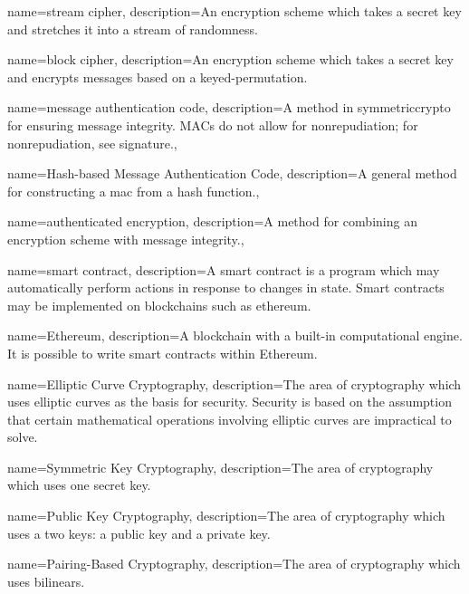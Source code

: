 {
    name={stream cipher},
    description={An \gls{encryption scheme} which takes a secret key
        and stretches it into a stream of randomness.}
}

{
    name={block cipher},
    description={An \gls{encryption scheme} which takes a secret key
        and encrypts messages based on a keyed-\gls{permutation}.}
}

{
    name={message authentication code},
    description={A method in \gls{symmetriccrypto} for ensuring
        message integrity.
        MACs do not allow for nonrepudiation;
        for nonrepudiation, see \gls{signature}.},
}

{
    name={Hash-based Message Authentication Code},
    description={A general method for constructing
        a \gls{mac} from a \gls{hash function}.},
}

{
    name={authenticated encryption},
    description={A method for combining an \gls{encryption scheme} with
        message integrity.},
}

{
    name={smart contract},
    description={A smart contract is a program which may automatically
        perform actions in response to changes in state.
        Smart contracts may be implemented on blockchains such as
        \gls{ethereum}.}
}

{
    name={Ethereum},
    description={A blockchain with a built-in computational engine.
        It is possible to write \glspl{smart contract} within Ethereum.}
}

{
    name={Elliptic Curve Cryptography},
    description={The area of cryptography which uses \glspl{elliptic curve}
        as the basis for security.
        Security is based on the assumption that certain
        mathematical operations involving \glspl{elliptic curve}
        are impractical to solve.}
}

{
    name={Symmetric Key Cryptography},
    description={The area of cryptography which uses one secret key.}
}

{
    name={Public Key Cryptography},
    description={The area of cryptography which uses a two keys:
        a public key and a private key.}
}

{
    name={Pairing-Based Cryptography},
    description={The area of cryptography which uses \glspl{bilinear}.}
}

